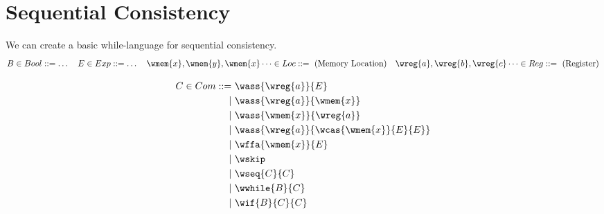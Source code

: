 \section{Sequential Consistency}
We can create a basic while-language for sequential consistency.
\[\begin{matrix}
		B \in Bool ::= \dots & E \in Exp::= \dots & \wmem{x}, \wmem{y}, \wmem{x} \dots \in Loc ::= \text{ (Memory Location)} & \wreg{a}, \wreg{b}, \wreg{c} \dots \in Reg ::= \text{ (Register)} \\
	\end{matrix}\]

\[\begin{split}
		C \in Com ::= &\  \wass{\wreg{a}}{E} \\
		| & \  \wass{\wreg{a}}{\wmem{x}} \\
		| & \  \wass{\wmem{x}}{\wreg{a}} \\
		| & \  \wass{\wreg{a}}{\wcas{\wmem{x}}{E}{E}}\\
		| & \  \wffa{\wmem{x}}{E} \\
		| & \  \wskip \\
		| & \  \wseq{C}{C} \\
		| & \  \wwhile{B}{C} \\
		| & \  \wif{B}{C}{C} \\
	\end{split}\]

